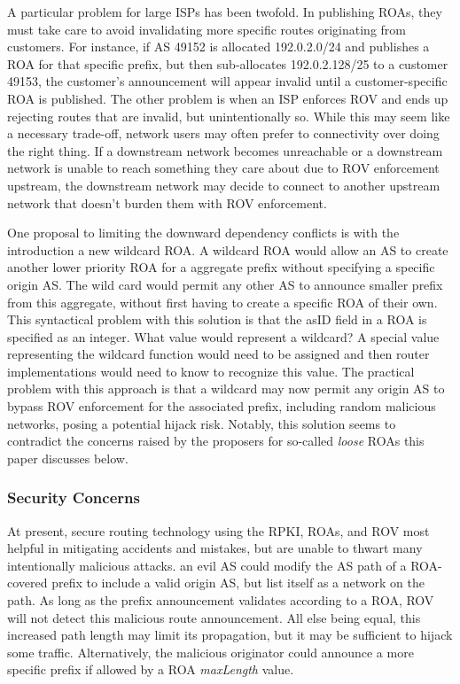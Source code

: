 \documentclass[sigconf]{acmart}
\begin{document}
A particular problem for large ISPs has been twofold.  In publishing
ROAs, they must take care to avoid invalidating more specific routes
originating from customers.  For instance, if AS 49152 is allocated
192.0.2.0/24 and publishes a ROA for that specific prefix, but then
sub-allocates 192.0.2.128/25 to a customer 49153, the customer's
announcement will appear invalid until a customer-specific ROA is
published.  The other problem is when an ISP enforces ROV and ends up
rejecting routes that are invalid, but unintentionally so.  While this
may seem like a necessary trade-off, network users may often prefer to
connectivity over doing the right thing.  If a downstream network
becomes unreachable or a downstream network is unable to reach something
they care about due to ROV enforcement upstream, the downstream network
may decide to connect to another upstream network that doesn't burden
them with ROV enforcement.

One proposal to limiting the downward dependency conflicts is with the
introduction a new wildcard ROA.\cite{gilad_are_2017}  A wildcard ROA
would allow an AS to create another lower priority ROA for a aggregate
prefix without specifying a specific origin AS.  The wild card would
permit any other AS to announce smaller prefix from this aggregate,
without first having to create a specific ROA of their own.  This
syntactical problem with this solution is that the asID field in a ROA
is specified as an integer.  What value would represent a wildcard?  A
special value representing the wildcard function would need to be
assigned and then router implementations would need to know to recognize
this value.  The practical problem with this approach is that a wildcard
may now permit any origin AS to bypass ROV enforcement for the
associated prefix, including random malicious networks, posing a
potential hijack risk.  Notably, this solution seems to contradict the
concerns raised by the proposers for so-called \emph{loose} ROAs
this paper discusses below.

\subsubsection{Security Concerns}

At present, secure routing technology using the RPKI, ROAs, and ROV most
helpful in mitigating accidents and mistakes, but are unable to thwart
many intentionally malicious attacks.  an evil AS could modify the AS
path of a ROA-covered prefix to include a valid origin AS, but list
itself as a network on the path.  As long as the prefix announcement
validates according to a ROA, ROV will not detect this malicious route
announcement.  All else being equal, this increased path length may
limit its propagation, but it may be sufficient to hijack some traffic.
Alternatively, the malicious originator could announce a more specific
prefix if allowed by a ROA \emph{maxLength} value.
\end{document}
